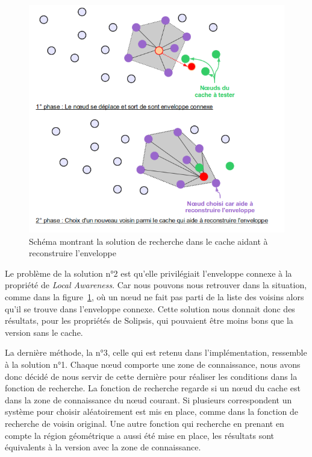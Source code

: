 	\begin{figure}[!h]
        \centering
        \includegraphics[scale=0.45]{./Ressources/Images/cacheReconstructEnvelop.png}
        \caption{Schéma montrant la solution de recherche dans le cache aidant à reconstruire l'enveloppe}
        \label{schemaEnvelopCache}
        \end{figure}
Le problème de la solution n°2 est qu'elle privilégiait l'enveloppe connexe à la propriété de \textit{Local Awareness}. Car nous pouvons nous retrouver dans la situation, comme dans la figure~\ref{schemaEnvelopCache}, où un nœud ne fait pas parti de la liste des voisins alors qu'il se trouve dans l'enveloppe connexe. Cette solution nous donnait donc des résultats, pour les propriétés de Solipsis, qui pouvaient être moins bons que la version sans le cache.  

\par La dernière méthode, la n°3, celle qui est retenu dans l'implémentation, ressemble à la solution n°1. Chaque nœud comporte une zone de connaissance, nous avons donc décidé de nous servir de cette dernière pour réaliser les conditions dans la fonction de recherche. La fonction de recherche regarde si un nœud du cache est dans la zone de connaissance du nœud courant. Si plusieurs correspondent un système pour choisir aléatoirement est mis en place, comme dans la fonction de recherche de voisin original. Une autre fonction qui recherche en prenant en compte la région géométrique a aussi été mise en place, les résultats sont équivalents à la version avec la zone de connaissance.

